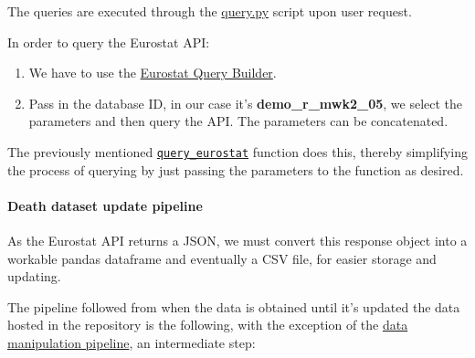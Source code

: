 \documentclass[
  a4paper]{article}
\begin{document}
The queries are executed through the
\href{https://github.com/dreth/tfm_uc3m/blob/main/api/query.py\#L26}{query.py}
script upon user request.

In order to query the Eurostat API:

\begin{enumerate}
\def\labelenumi{\arabic{enumi}.}
\item
  We have to use the
  \href{https://ec.europa.eu/eurostat/web/json-and-unicode-web-services/getting-started/query-builder}{Eurostat
  Query Builder}.
\item
  Pass in the database ID, in our case it's \textbf{demo\_r\_mwk2\_05},
  we select the parameters and then query the API. The parameters can be
  concatenated.
\end{enumerate}

The previously mentioned
\href{https://github.com/dreth/tfm_uc3m/blob/report_ref/api/functions.py\#L23}{\texttt{query\_eurostat}}
function does this, thereby simplifying the process of querying by just
passing the parameters to the function as desired.

\hypertarget{death-dataset-update-pipeline}{%
\paragraph{Death dataset update
pipeline}\label{death-dataset-update-pipeline}}

As the Eurostat API returns a JSON, we must convert this response object
into a workable pandas dataframe and eventually a CSV file, for easier
storage and updating.

The pipeline followed from when the data is obtained until it's updated
the data hosted in the repository is the following, with the exception
of the \protect\hyperlink{DeathDatasetPipeline}{data manipulation
pipeline}, an intermediate step:
\end{document}
